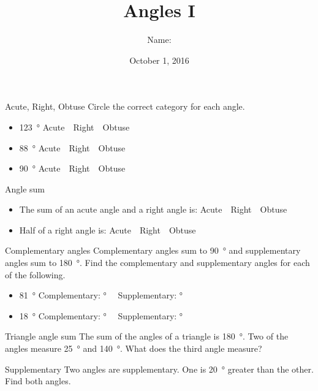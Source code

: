 \documentclass[14pt,letterpaper]{article}
\title{Angles I}
\author{Name: \underline{\hspace{5cm}}}
\date{October 1, 2016}
\begin{document}
\HomeworkTitle

\thispagestyle{empty}

\begin{problem}{Acute, Right, Obtuse}
 Circle the correct category for each angle.

 \begin{itemize}
  \item \SI{123}{\degree} \hfill Acute~~Right~~Obtuse
  \item \SI{88}{\degree} \hfill Acute~~Right~~Obtuse
  \item \SI{90}{\degree} \hfill Acute~~Right~~Obtuse
 \end{itemize}
\end{problem}

\begin{problem}{Angle sum}
 \begin{itemize}
  \item The sum of an acute angle and a right angle is:
        \hfill Acute~~Right~~Obtuse
  \item Half of a right angle is:
        \hfill Acute~~Right~~Obtuse
 \end{itemize}
\end{problem}

\begin{problem}{Complementary angles}
 Complementary angles sum to \SI{90}{\degree} and supplementary angles sum to
 \SI{180}{\degree}. Find the complementary and supplementary angles for each of
 the following.

 \begin{itemize}
  \item \SI{81}{\degree} \hfill Complementary: \blankC \si{\degree}~~
  Supplementary: \blankC \si{\degree}
  \item \SI{18}{\degree} \hfill Complementary: \blankC \si{\degree}~~
  Supplementary: \blankC \si{\degree}
 \end{itemize}

\end{problem}

\begin{problem}{Triangle angle sum}
 The sum of the angles of a triangle is \SI{180}{\degree}. Two of the angles
 measure \SI{25}{\degree} and \SI{140}{\degree}. What does the third angle
 measure?
\end{problem}

\begin{problem}{Supplementary}
 Two angles are supplementary. One is \SI{20}{\degree} greater than the other.
 Find both angles.
\end{problem}
\end{document}
